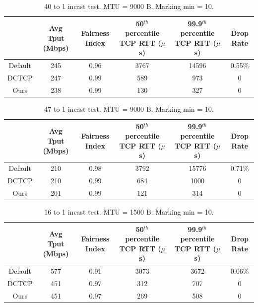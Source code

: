 \begin{table}[!htb]
\begin{center}
\begin{tabular}{ |c|c|c|c|c|c| }
 \hline
  & Avg Tput (Mbps) & Fairness Index & 50$^{th}$ percentile TCP RTT ($\mu$s) & 99.9$^{th}$ percentile TCP RTT ($\mu$s) & Drop Rate \\
 \hline

 Default & 245 & 0.96 & 3767 & 14596 & 0.55\% \\
 DCTCP  & 247 & 0.99 & 589 & 973 & 0 \\
 Ours & 238 & 0.99 &  130 & 327 & 0 \\
 \hline
\end{tabular}
\caption{40 to 1 incast test. MTU = 9000 B. Marking min = 10.}
\label{incast_40to1_tbl_9000_markingMin10}
\end{center}
\end{table}


\begin{table}[!htb]
\begin{center}
\begin{tabular}{ |c|c|c|c|c|c| }
 \hline
  & Avg Tput (Mbps) & Fairness Index & 50$^{th}$ percentile TCP RTT ($\mu$s) & 99.9$^{th}$ percentile TCP RTT ($\mu$s) & Drop Rate \\
 \hline

 Default & 210 & 0.98 & 3792 & 15776 & 0.71\% \\
 DCTCP  & 210 & 0.99 & 684 & 1000 & 0 \\
 Ours & 201 & 0.99 &  121 & 314 & 0 \\
 \hline
\end{tabular}
\caption{47 to 1 incast test. MTU = 9000 B. Marking min = 10.}
\label{incast_47to1_tbl_9000_markingMin10}
\end{center}
\end{table}



\iffalse
\begin{table}[!htb]
\begin{center}
\begin{tabular}{ |c|c|c|c|c|c| }
 \hline
  & Avg Tput (Mbps) & Fairness Index & 50$^{th}$ percentile TCP RTT ($\mu$s) & 99.9$^{th}$ percentile TCP RTT ($\mu$s) & Drop Rate \\
 \hline

 Default & 577 & 0.91 & 3073 & 3672 & 0.06\% \\
 DCTCP  & 451 & 0.97 & 312 & 707 & 0 \\
 Ours & 451 & 0.97 &  269 & 508 & 0 \\
 \hline
\end{tabular}
\caption{16 to 1 incast test. MTU = 1500 B. Marking min = 10.}
\label{incast_16to1_tbl_1500}
\end{center}
\end{table}

